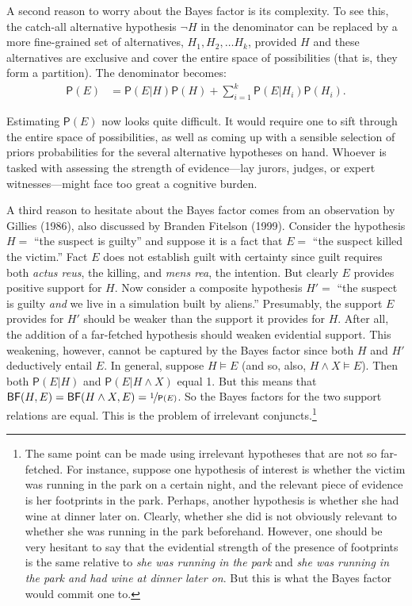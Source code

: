 \documentclass[
  10pt,
  dvipsnames,enabledeprecatedfontcommands]{scrartcl}
\newcommand{\et}{\wedge}
\newcommand{\pr}[1]{\mathsf{P}(#1)}
\begin{document}
A second reason to worry about the Bayes factor is its complexity. To
see this, the catch-all alternative hypothesis \(\neg H\) in the
denominator can be replaced by a more fine-grained set of alternatives,
\(H_1, H_2, \dots H_k\), provided \(H\) and these alternatives are
exclusive and cover the entire space of possibilities (that is, they
form a partition). The denominator becomes:
\begin{align} \label{eq:lotpLong}
\pr{E} & = \pr{E\vert H}\pr{H} +\sum_{i=1}^k \pr{E\vert H_i}\pr{H_i}. 
\end{align}

\noindent Estimating \(\pr{E}\) now looks quite difficult. It would
require one to sift through the entire space of possibilities, as well
as coming up with a sensible selection of priors probabilities for the
several alternative hypotheses on hand. Whoever is tasked with assessing
the strength of evidence---lay jurors, judges, or expert
witnesses---might face too great a cognitive burden.

A third reason to hesitate about the Bayes factor comes from an
observation by Gillies (1986), also discussed by Branden Fitelson
(1999). Consider the hypothesis \(H =\) ``the suspect is guilty'' and
suppose it is a fact that \(E =\) ``the suspect killed the victim.''
Fact \(E\) does not establish guilt with certainty since guilt requires
both \emph{actus reus}, the killing, and \emph{mens rea}, the intention.
But clearly \(E\) provides positive support for \(H\). Now consider a
composite hypothesis \(H'=\) ``the suspect is guilty \textit{and} we
live in a simulation built by aliens.'' Presumably, the support \(E\)
provides for \(H'\) should be weaker than the support it provides for
\(H\). After all, the addition of a far-fetched hypothesis should weaken
evidential support. This weakening, however, cannot be captured by the
Bayes factor since both \(H\) and \(H'\) deductively entail \(E\). In
general, suppose \(H\models E\) (and so, also, \(H \et X \models E\)).
Then both \(\pr{E\vert H}\) and \(\pr{E \vert H \et X}\) equal 1. But
this means that
\(\mathsf{BF}(H,E) = \mathsf{BF}(H \et X, E) = \nicefrac{1}{\pr{E}}\).
So the Bayes factors for the two support relations are equal. This is
the problem of irrelevant conjuncts.\footnote{The same point can be made
  using irrelevant hypotheses that are not so far-fetched. For instance,
  suppose one hypothesis of interest is whether the victim was running
  in the park on a certain night, and the relevant piece of evidence is
  her footprints in the park. Perhaps, another hypothesis is whether she
  had wine at dinner later on. Clearly, whether she did is not obviously
  relevant to whether she was running in the park beforehand. However,
  one should be very hesitant to say that the evidential strength of the
  presence of footprints is the same relative to
  \emph{she was running in the park} and
  \emph{she was running in the park and had wine at dinner later on}.
  But this is what the Bayes factor would commit one to.}
\end{document}

